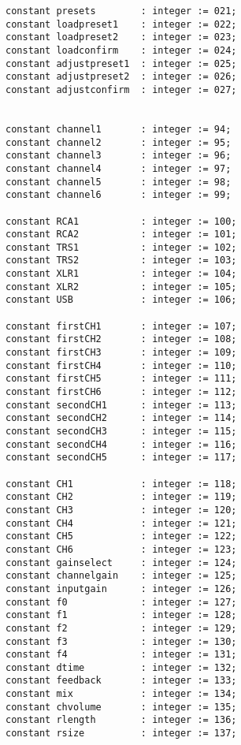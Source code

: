 \begin{lstlisting}
constant presets		: integer := 021;
constant loadpreset1	: integer := 022;
constant loadpreset2	: integer := 023;
constant loadconfirm	: integer := 024;
constant adjustpreset1	: integer := 025;
constant adjustpreset2	: integer := 026;
constant adjustconfirm	: integer := 027;


constant channel1		: integer := 94; 
constant channel2		: integer := 95; 
constant channel3		: integer := 96; 
constant channel4		: integer := 97; 
constant channel5		: integer := 98; 
constant channel6		: integer := 99;

constant RCA1			: integer := 100;
constant RCA2			: integer := 101;
constant TRS1			: integer := 102;
constant TRS2			: integer := 103;
constant XLR1			: integer := 104;
constant XLR2			: integer := 105;
constant USB			: integer := 106;
	
constant firstCH1		: integer := 107;
constant firstCH2		: integer := 108;
constant firstCH3		: integer := 109;
constant firstCH4		: integer := 110;
constant firstCH5		: integer := 111;
constant firstCH6		: integer := 112;
constant secondCH1		: integer := 113;
constant secondCH2		: integer := 114;
constant secondCH3		: integer := 115;
constant secondCH4		: integer := 116;
constant secondCH5		: integer := 117;
	
constant CH1			: integer := 118;
constant CH2			: integer := 119;
constant CH3			: integer := 120;
constant CH4			: integer := 121;
constant CH5			: integer := 122;
constant CH6			: integer := 123;
constant gainselect		: integer := 124;
constant channelgain	: integer := 125;
constant inputgain		: integer := 126;
constant f0				: integer := 127;
constant f1				: integer := 128;
constant f2				: integer := 129;
constant f3				: integer := 130;
constant f4				: integer := 131;
constant dtime			: integer := 132;
constant feedback		: integer := 133;
constant mix			: integer := 134;
constant chvolume		: integer := 135;
constant rlength		: integer := 136;
constant rsize			: integer := 137;
	

\end{lstlisting}
